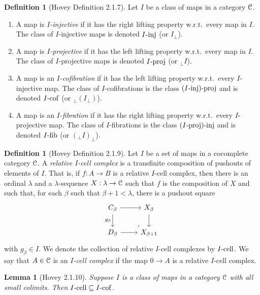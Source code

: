\documentclass{amsart}
\theoremstyle{plain}
\newtheorem{lemma}[theorem]{Lemma}
\theoremstyle{definition}
\newtheorem{definition}[theorem]{Definition}
\newcommand{\sseq}{\subseteq}
\newcommand{\0}{\mathbf{0}}
\newcommand{\cC}{\mathcal C}
\renewcommand{\(}{\left(}
\renewcommand{\)}{\right)}
\def\scr{\EuScript}
\def\cC{\scr{C}}
\newcommand{\inj}{\text-\mathrm{inj}}
\newcommand{\proj}{\text-\mathrm{proj}}
\newcommand{\fib}{\text-\mathrm{fib}}
\newcommand{\cell}{\text-\mathrm{cell}}
\newcommand{\cof}{\text-\mathrm{cof}}
\begin{document}
\begin{definition}[Hovey Definition 2.1.7]
  Let $I$ be a class of maps in a category $\cC$.\begin{enumerate}
    \item A map is \textit{$I$-injective} if it has the right lifting property w.r.t.\ every map in $I$. The class of $I$-injective maps is denoted $I\inj$ (or $I_\perp$).
    \item A map is \textit{$I$-projective} if it has the left lifting property w.r.t.\ every map in $I$. The class of $I$-projective maps is denoted $I\proj$ (or $_\perp I$).
    \item A map is an \textit{$I$-cofibration} if it has the left lifting property w.r.t.\ every $I$-injective map. The class of $I$-cofibrations is the class $(I\inj)\proj$ and is denoted $I\cof$ (or $_\perp(I_\perp)$).
    \item A map is an \textit{$I$-fibration} if it has the right lifting property w.r.t.\ every $I$-projective map. The class of $I$-fibrations is the class $(I\proj)\inj$ and is denoted $I\fib$ (or $(_\perp I)_\perp$).
  \end{enumerate}
\end{definition}

\begin{definition}[Hovey Definition 2.1.9]
  Let $I$ be a set of maps in a cocomplete category $\cC$. A \textit{relative $I$-cell complex} is a transfinite composition of pushouts of elements of $I$. That is, if $f:A\to B$ is a relative $I$-cell complex, then there is an ordinal $\lambda$ and a $\lambda$-sequence $X:\lambda\to\cC$ such that $f$ is the composition of $X$ and such that, for each $\beta$ such that $\beta+1<\lambda$, there is a pushout square
  \[\begin{tikzcd}
    {C_\beta} & {X_\beta} \\
    {D_\beta} & {X_{\beta+1}}
    \arrow[from=1-1, to=1-2]
    \arrow[from=1-2, to=2-2]
    \arrow[from=2-1, to=2-2]
    \arrow["\ulcorner"{anchor=center, pos=0.125, rotate=180}, draw=none, from=2-2, to=1-1]
    \arrow["{g_\beta}"', from=1-1, to=2-1]
  \end{tikzcd}\]
  with $g_\beta\in I$. We denote the collection of relative $I$-cell complexes by $I\cell$. We say that $A\in\cC$ is an \textit{$I$-cell complex} if the map $0\to A$ is a relative $I$-cell complex.
\end{definition}

\begin{lemma}[Hovey 2.1.10]\label{2.1.10}
  Suppose $I$ is a class of maps in a category $\cC$ with all small colimits. Then $I\cell\sseq I\cof$.
\end{lemma}
\end{document}
